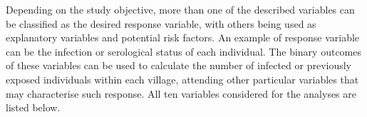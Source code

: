 Depending on the study objective, more than one of the described variables can be classified as the desired response variable, with others being used as explanatory variables and potential risk factors.
An example of response variable can be the infection or serological status of each individual.
The binary outcomes of these variables can be used to calculate the number of infected or previously exposed individuals within each village, attending other particular variables that may characterise such response.
All ten variables considered for the analyses are listed below.
%
